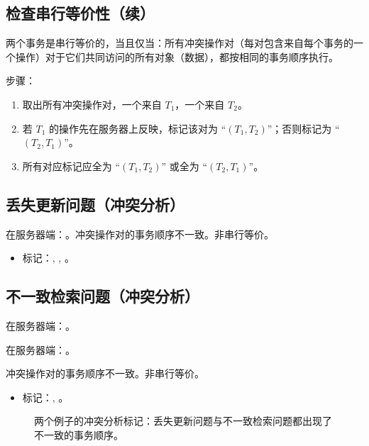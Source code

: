 \subsection{检查串行等价性（续）}

两个事务是串行等价的，当且仅当：所有冲突操作对（每对包含来自每个事务的一个操作）对于它们共同访问的所有对象（数据），都按相同的事务顺序执行。

步骤：

\begin{enumerate}
  \item 取出所有冲突操作对，一个来自 $T_1$，一个来自 $T_2$。
  \item 若 $T_1$ 的操作先在服务器上反映，标记该对为 ``$(T_1,T_2)$''；否则标记为 ``$(T_2,T_1)$''。
  \item 所有对应标记应全为 ``$(T_1,T_2)$'' 或全为 ``$(T_2,T_1)$''。
\end{enumerate}

\subsection{丢失更新问题（冲突分析）}

在服务器端：。冲突操作对的事务顺序不一致。非串行等价。

\begin{itemize}
  \item 标记：, , 。
\end{itemize}

\subsection{不一致检索问题（冲突分析）}

在服务器端：。

在服务器端：。

冲突操作对的事务顺序不一致。非串行等价。

\begin{itemize}
  \item 标记：, 。
\end{itemize}

\begin{figure}[H]
  \centering
  \caption{两个例子的冲突分析标记：丢失更新问题与不一致检索问题都出现了不一致的事务顺序。}
\end{figure}

